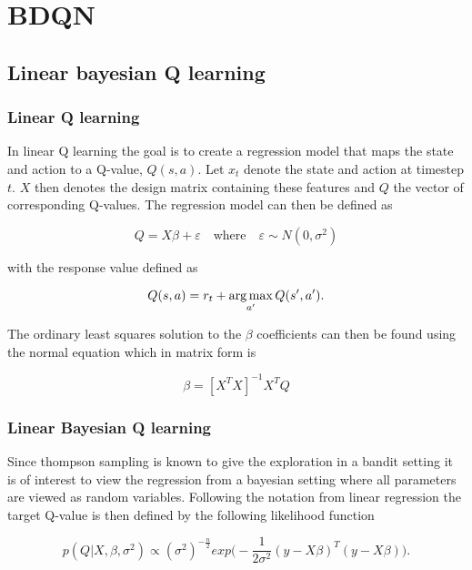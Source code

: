 \chapter{BDQN}{\label{ch:ube}}

\section{Linear bayesian Q learning}

\subsection{Linear Q learning}

In linear Q learning the goal is to create a regression model that maps the state and action to a Q-value, $Q(s,a)$. Let $x_t$ denote the state and action at timestep $t$. $X$ then denotes the design matrix containing these features and $Q$ the vector of corresponding Q-values. The regression model can then be defined as

\begin{equation*}
Q = X\beta + \varepsilon \quad \text{where} \quad \varepsilon \sim N(0,\sigma^2)
\end{equation*}

with the response value defined as 

\begin{equation*}
Q(s,a) = r_t + \operatorname*{arg\,max}_{a'}Q(s',a').
\end{equation*}

The ordinary least squares solution to the $\beta$ coefficients can then be found using the normal equation which in matrix form is

\begin{equation*}
\beta = [X^TX]^{-1}X^TQ
\end{equation*}

\subsection{Linear Bayesian Q learning}

Since thompson sampling is known to give the exploration in a bandit setting it is of interest to view the regression from a bayesian setting where all parameters are viewed as random variables. Following the notation from linear regression the target Q-value is then defined by the following likelihood function

\begin{equation*}
p(Q|X,\beta, \sigma^2) \propto (\sigma^2)^{-\frac{n}{2}}exp\bigg(-\frac{1}{2\sigma^2}(y-X\beta)^T(y-X\beta)\bigg).
\end{equation*}

